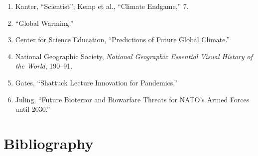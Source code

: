 \documentclass[12pt]{article}
\begin{document}
\begin{enumerate}[leftmargin=*]
\item Kanter, ``Scientist''; Kemp et al., ``Climate Endgame,'' 7.
\item ``Global Warming.''
\item Center for Science Education, ``Predictions of Future Global Climate.''
\item National Geographic Society, \textit{National Geographic Essential Visual History of the World}, 190--91.
\item Gates, ``Shattuck Lecture Innovation for Pandemics.''
\item Juling, ``Future Bioterror and Biowarfare Threats for NATO’s Armed Forces until 2030.''
\end{enumerate}

\clearpage
\section*{Bibliography}
\end{document}
